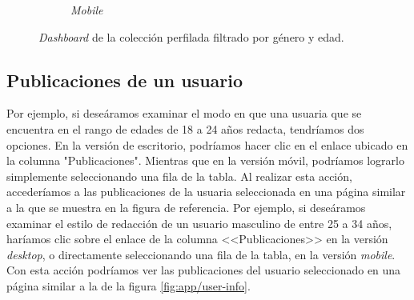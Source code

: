 \begin{figure}[H]
\begin{subfigure}{0.223\textwidth}
  \caption{\textit{Mobile}} 
  \end{subfigure}
  \caption{\textit{Dashboard} de la colección perfilada filtrado por género y edad.}
  \label{fig:app/dashboard-filtered-edad-genero}
\end{figure}

\subsection{Publicaciones de un usuario}
Por ejemplo, si deseáramos examinar el modo en que una usuaria que se encuentra en el rango de edades de 18 a 24 años redacta, tendríamos dos opciones. En la versión de escritorio, podríamos hacer clic en el enlace ubicado en la columna "Publicaciones". Mientras que en la versión móvil, podríamos lograrlo simplemente seleccionando una fila de la tabla. Al realizar esta acción, accederíamos a las publicaciones de la usuaria seleccionada en una página similar a la que se muestra en la figura de referencia.
Por ejemplo, si deseáramos examinar el estilo de redacción de un usuario masculino de entre 25 a 34 años, haríamos clic sobre el enlace de la columna <<Publicaciones>> en la versión \textit{desktop}, o directamente seleccionando una fila de la tabla, en la versión \textit{mobile}. Con esta acción podríamos ver las publicaciones del usuario seleccionado en una página similar a la de la figura \ref{fig:app/user-info}.

